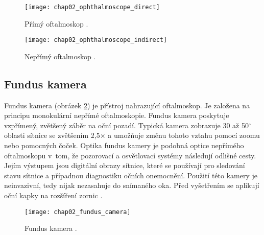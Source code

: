 \begin{figure}[h]
  \begin{minipage}[c]{0.47\textwidth}
    \texttt{[image: chap02\_ophthalmoscope\_direct]}
    \caption{Přímý oftalmoskop \cite{pic_dir_scope}.}
    \label{pic:chap02_ophthalmoscope_direct}
  \end{minipage}
  \hfill
  \begin{minipage}[c]{0.47\textwidth}
    \texttt{[image: chap02\_ophthalmoscope\_indirect]}
    \caption{Nepřímý oftalmoskop \cite{pic_indir_scope}.}
    \label{pic:chap02_ophthalmoscope_indirect}
  \end{minipage}
\end{figure}
  

\subsection*{Fundus kamera}
Fundus kamera (obrázek \ref{pic:chap02_fundus_camera}) je přístroj nahrazující oftalmoskop. Je založena na principu monokulární nepřímé oftalmoskopie. Fundus kamera poskytuje vzpřímený, zvětšený záběr na oční pozadí. Typická kamera zobrazuje 30 až 50$^\circ$ oblasti sítnice se zvětšením 2,5$\times$ a umožňuje změnu tohoto vztahu pomocí zoomu nebo pomocných čoček. Optika fundus kamery je podobná optice nepřímého oftalmoskopu v~tom, že pozorovací a osvětlovací systémy následují odlišné cesty. Jejím výstupem jsou digitální obrazy sítnice, které se používají pro sledování stavu sítnice a případnou diagnostiku očních onemocnění. Použití této kamery je neinvazivní, tedy nijak nezasahuje do snímaného oka. Před vyšetřením se aplikují oční kapky na rozšíření zornic \cite{pristroje}.

\begin{figure}[h]
  \begin{center}
    \texttt{[image: chap02\_fundus\_camera]}
    \caption{Fundus kamera \cite{pic_fundus}.}
    \label{pic:chap02_fundus_camera}
  \end{center}
\end{figure}